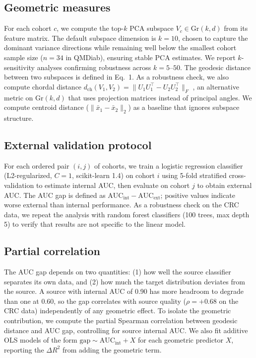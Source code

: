 \documentclass[11pt]{article}
\begin{document}
\subsection{Geometric measures}

For each cohort $c$, we compute the top-$k$ PCA subspace $V_c \in \mathrm{Gr}(k, d)$ from its feature matrix. The default subspace dimension is $k = 10$, chosen to capture the dominant variance directions while remaining well below the smallest cohort sample size ($n = 34$ in QMDiab), ensuring stable PCA estimates. We report $k$-sensitivity analyses confirming robustness across $k = 5$--$50$. The geodesic distance between two subspaces is defined in Eq.~1. As a robustness check, we also compute chordal distance $d_{\mathrm{ch}}(V_1, V_2) = \|U_1 U_1^\top - U_2 U_2^\top\|_F$ \citep{conway1996functions}, an alternative metric on $\mathrm{Gr}(k, d)$ that uses projection matrices instead of principal angles. We compute centroid distance ($\|\bar{x}_1 - \bar{x}_2\|_2$) as a baseline that ignores subspace structure.

\subsection{External validation protocol}

For each ordered pair $(i, j)$ of cohorts, we train a logistic regression classifier (L2-regularized, $C = 1$, scikit-learn 1.4) on cohort $i$ using 5-fold stratified cross-validation to estimate internal AUC, then evaluate on cohort $j$ to obtain external AUC. The AUC gap is defined as $\text{AUC}_{\mathrm{int}} - \text{AUC}_{\mathrm{ext}}$; positive values indicate worse external than internal performance. As a robustness check on the CRC data, we repeat the analysis with random forest classifiers (100 trees, max depth 5) to verify that results are not specific to the linear model.

\subsection{Partial correlation}

The AUC gap depends on two quantities: (1) how well the source classifier separates its own data, and (2) how much the target distribution deviates from the source. A source with internal AUC of 0.90 has more headroom to degrade than one at 0.60, so the gap correlates with source quality ($\rho = +0.68$ on the CRC data) independently of any geometric effect. To isolate the geometric contribution, we compute the partial Spearman correlation between geodesic distance and AUC gap, controlling for source internal AUC. We also fit additive OLS models of the form $\mathrm{gap} \sim \mathrm{AUC_{int}} + X$ for each geometric predictor $X$, reporting the $\Delta R^2$ from adding the geometric term.
\end{document}
